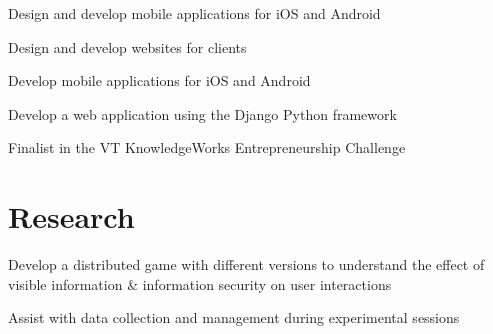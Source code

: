 \documentclass[]{resume}
\begin{document}
\begin{minipage}[t]{0.60\textwidth}
\begin{tightemize}
\item Design and develop mobile applications for iOS and Android
\item Design and develop websites for clients
\end{tightemize}
\sectionsep

\begin{tightemize}
\item Develop mobile applications for iOS and Android
\item Develop a web application using the Django Python framework
\item Finalist in the VT KnowledgeWorks Entrepreneurship Challenge
\end{tightemize}
\sectionsep



\section{Research}
\begin{tightemize}
\item Develop a distributed game with different versions to understand the effect of visible information \& information security on user interactions
\item Assist with data collection and management during experimental sessions
\end{tightemize}
\sectionsep


\end{minipage} 
\end{document}
